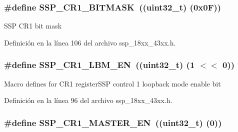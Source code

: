 \subsubsection[{\texorpdfstring{S\+S\+P\+\_\+\+C\+R1\+\_\+\+B\+I\+T\+M\+A\+SK}{SSP_CR1_BITMASK}}]{\setlength{\rightskip}{0pt plus 5cm}\#define S\+S\+P\+\_\+\+C\+R1\+\_\+\+B\+I\+T\+M\+A\+SK~((uint32\+\_\+t) (0x0\+F))}\hypertarget{group___s_s_p__18_x_x__43_x_x_gad90a9c1c97a5c4e19e048e9686a4d8fa}{}\label{group___s_s_p__18_x_x__43_x_x_gad90a9c1c97a5c4e19e048e9686a4d8fa}
S\+SP C\+R1 bit mask 

Definición en la línea 106 del archivo ssp\+\_\+18xx\+\_\+43xx.\+h.

\subsubsection[{\texorpdfstring{S\+S\+P\+\_\+\+C\+R1\+\_\+\+L\+B\+M\+\_\+\+EN}{SSP_CR1_LBM_EN}}]{\setlength{\rightskip}{0pt plus 5cm}\#define S\+S\+P\+\_\+\+C\+R1\+\_\+\+L\+B\+M\+\_\+\+EN~((uint32\+\_\+t) (1 $<$$<$ 0))}\hypertarget{group___s_s_p__18_x_x__43_x_x_gac0e5bef37b94df5ad96bf270aa802dcd}{}\label{group___s_s_p__18_x_x__43_x_x_gac0e5bef37b94df5ad96bf270aa802dcd}
Macro defines for C\+R1 register\+S\+SP control 1 loopback mode enable bit 

Definición en la línea 96 del archivo ssp\+\_\+18xx\+\_\+43xx.\+h.

\subsubsection[{\texorpdfstring{S\+S\+P\+\_\+\+C\+R1\+\_\+\+M\+A\+S\+T\+E\+R\+\_\+\+EN}{SSP_CR1_MASTER_EN}}]{\setlength{\rightskip}{0pt plus 5cm}\#define S\+S\+P\+\_\+\+C\+R1\+\_\+\+M\+A\+S\+T\+E\+R\+\_\+\+EN~((uint32\+\_\+t) (0))}\hypertarget{group___s_s_p__18_x_x__43_x_x_gaa8e064b00be6db00e597ad2509a633c3}{}\label{group___s_s_p__18_x_x__43_x_x_gaa8e064b00be6db00e597ad2509a633c3}


